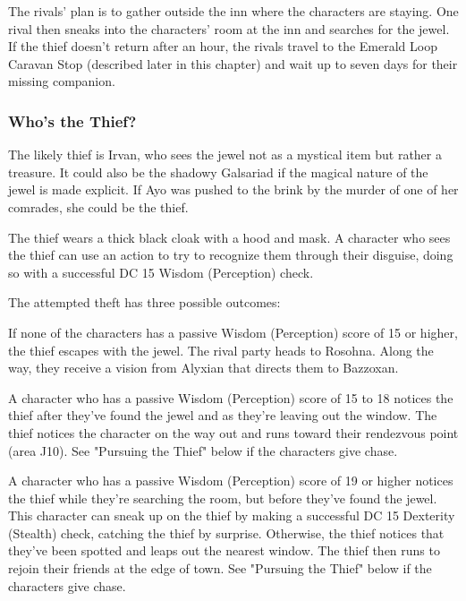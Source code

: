 \documentclass[10pt,a4paper,twoside,twocolumn,openany,nodeprecatedcode]{dndbook}
\begin{document}
The rivals' plan is to gather outside the inn where the characters are staying. One rival then sneaks into the characters' room at the inn and searches for the jewel. If the thief doesn't return after an hour, the rivals travel to the Emerald Loop Caravan Stop (described later in this chapter) and wait up to seven days for their missing companion.

\subsubsection{Who's the Thief?}
The likely thief is Irvan, who sees the jewel not as a mystical item but rather a treasure. It could also be the shadowy Galsariad if the magical nature of the jewel is made explicit. If Ayo was pushed to the brink by the murder of one of her comrades, she could be the thief.

The thief wears a thick black cloak with a hood and mask. A character who sees the thief can use an action to try to recognize them through their disguise, doing so with a successful DC 15 Wisdom (Perception) check.

The attempted theft has three possible outcomes:


\begin{description}[nolistsep]
\item[Caught Sleeping.]
If none of the characters has a passive Wisdom (Perception) score of 15 or higher, the thief escapes with the jewel. The rival party heads to Rosohna. Along the way, they receive a vision from Alyxian that directs them to Bazzoxan.
\item[Slow to Act.]
A character who has a passive Wisdom (Perception) score of 15 to 18 notices the thief after they've found the jewel and as they're leaving out the window. The thief notices the character on the way out and runs toward their rendezvous point (area J10). See "Pursuing the Thief" below if the characters give chase.
\item[Quick to Act.]
A character who has a passive Wisdom (Perception) score of 19 or higher notices the thief while they're searching the room, but before they've found the jewel. This character can sneak up on the thief by making a successful DC 15 Dexterity (Stealth) check, catching the thief by surprise. Otherwise, the thief notices that they've been spotted and leaps out the nearest window. The thief then runs to rejoin their friends at the edge of town. See "Pursuing the Thief" below if the characters give chase.
\end{description}
\end{document}
